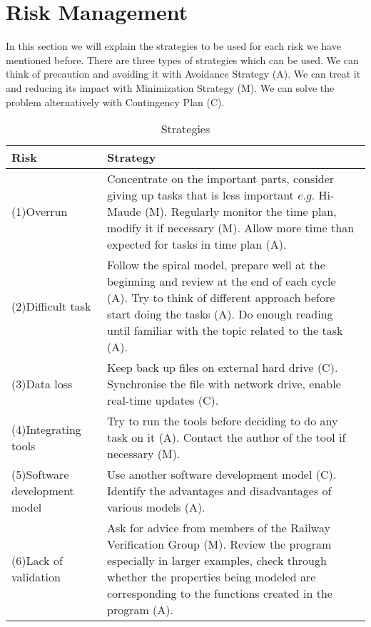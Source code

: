 \documentclass[a4paper,11pt]{report}
\begin{document}
\section{Risk Management}
In this section we will explain the strategies to be used for each risk we have mentioned before. There are three types of strategies which can be used. We can think of precaution and avoiding it with Avoidance Strategy (A). We can treat it and reducing its impact with Minimization Strategy (M). We can solve the problem alternatively with Contingency Plan (C).
\begin{table}[h]
\hspace{-2cm}
\renewcommand\arraystretch{2.4}
\begin{tabular}{|l|p{12cm}|}
\hline
\textbf{Risk} & \textbf{Strategy} \\ \hline
    (1)Overrun      &  Concentrate on the important parts, consider giving up tasks that is less important $e.g.$ Hi-Maude (M). \newline Regularly monitor the time plan, modify it if necessary (M). \newline Allow more time than expected for tasks in time plan (A). \\ \hline
    (2)Difficult task      &  Follow the spiral model, prepare well at the beginning and review at the end of each cycle (A). \newline Try to think of different approach before start doing the tasks (A). \newline Do enough reading until familiar with the topic related to the task (A). \\ \hline
    (3)Data loss      &  Keep back up files on external hard drive (C). \newline Synchronise the file with network drive, enable real-time updates (C). \\ \hline
    (4)Integrating tools      &  Try to run the tools before deciding to do any task on it (A). \newline Contact the author of the tool if necessary (M). \\ \hline
    (5)Software development model      &  Use another software development model (C). \newline Identify the advantages and disadvantages of various models (A). \\ \hline
		(6)Lack of validation & Ask for advice from members of the Railway Verification Group (M). \newline Review the program especially in larger examples, check through whether the properties being modeled are corresponding to the functions created in the program (A). \\ \hline
\end{tabular}
\caption{Strategies}
\end{table}
\FloatBarrier
\end{document}
